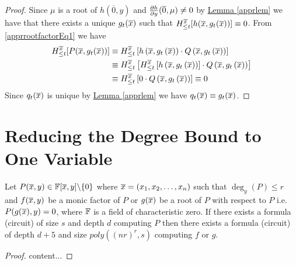 \documentclass{report}
\begin{document}
\begin{proof}
	Since $\mu$ is a root of $h(\overline{0},y)$ and $\frac{\partial h}{\partial y}(\overline{0},\mu)\neq 0$ by \hyperref[apprlem]{Lemma \ref{apprlem}} we have that there exists a unique $g_t(\overline{x})$ such that $H_{\leq t}^{\overline{x}}[h(\overline{x},g_t(\overline{x}))]\equiv 0$. From \eqref{apprrootfactorEq1} we have 
	\begin{align*}
		H_{\leq t}^{\overline{x}}[P(\overline{x},g_t(\overline{x}))] & \equiv H_{\leq t}^{\overline{x}}\left[h\left(\overline{x},g_t\left(\overline{x}\right)\right)\cdot Q\left(\overline{x},g_t\left(\overline{x}\right)\right)\right]                          \\
		                                     & \equiv H_{\leq t}^{\overline{x}}\left[H_{\leq t}^{\overline{x}}\left[h\left(\overline{x},g_t\left(\overline{x}\right)\right)\right]\cdot Q\left(\overline{x},g_t\left(\overline{x}\right)\right)\right] \\
		                                     & \equiv H_{\leq t}^{\overline{x}}\left[0\cdot Q\left(\overline{x},g_t\left(\overline{x}\right)\right)\right]\equiv 0
	\end{align*}
	Since $q_t(\overline{x})$ is unique by \hyperref[apprlem]{Lemma \ref{apprlem}} we have $q_t(\overline{x})\equiv g_t(\overline{x})$.
\end{proof}

\section{Reducing the Degree Bound to One Variable}
\begin{theorem}
	Let $P(\overline{x},y)\in\mathbb{F}[\overline{x},y]\backslash \{0\}$ where $\overline{x}=(x_1,x_2,\dots,x_n)$ such that $\deg_y(P)\leq r$ and $f(\overline{x},y)$ be a monic factor of $P$ or $g(\overline{x})$ be a root of $P$ with respect to $P$ i.e. $P(g(\overline{x}),y)=0$, where $\mathbb{F}$ is a field of characteristic zero. If there exists a formula (circuit) of size $s$ and depth $d$ computing $P$ then there exists a formula (circuit) of depth $d+5$  and size $poly((nr)^r,s)$ computing $f$ or $g$.
\end{theorem}

\begin{proof}
	content...
\end{proof}
\printbibliography
\end{document}
